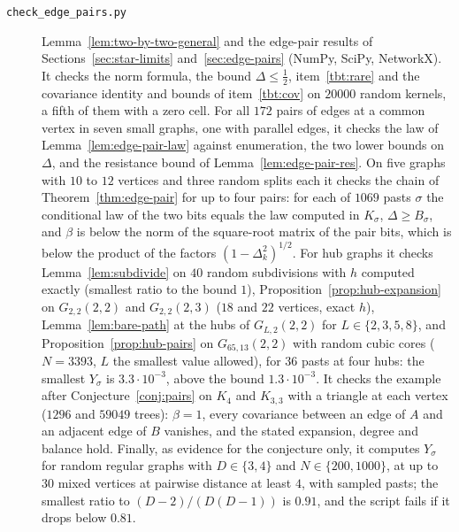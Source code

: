 \begin{description}
\item[\texttt{check\_edge\_pairs.py}] Lemma~\ref{lem:two-by-two-general} and the edge-pair results of Sections~\ref{sec:star-limits} and~\ref{sec:edge-pairs} (NumPy, SciPy, NetworkX). It checks the norm formula, the bound $\Delta\le\frac12$, item~\ref{tbt:rare} and the covariance identity and bounds of item~\ref{tbt:cov} on $20000$ random kernels, a fifth of them with a zero cell. For all $172$ pairs of edges at a common vertex in seven small graphs, one with parallel edges, it checks the law of Lemma~\ref{lem:edge-pair-law} against enumeration, the two lower bounds on $\Delta$, and the resistance bound of Lemma~\ref{lem:edge-pair-res}. On five graphs with $10$ to $12$ vertices and three random splits each it checks the chain of Theorem~\ref{thm:edge-pair} for up to four pairs: for each of $1069$ pasts $\sigma$ the conditional law of the two bits equals the law computed in $K_\sigma$, $\Delta\ge B_\sigma$, and $\beta$ is below the norm of the square-root matrix of the pair bits, which is below the product of the factors $(1-\Delta_k^2)^{1/2}$. For hub graphs it checks Lemma~\ref{lem:subdivide} on $40$ random subdivisions with $h$ computed exactly (smallest ratio to the bound $1$), Proposition~\ref{prop:hub-expansion} on $G_{2,2}(2,2)$ and $G_{2,2}(2,3)$ ($18$ and $22$ vertices, exact $h$), Lemma~\ref{lem:bare-path} at the hubs of $G_{L,2}(2,2)$ for $L\in\{2,3,5,8\}$, and Proposition~\ref{prop:hub-pairs} on $G_{65,13}(2,2)$ with random cubic cores ($N=3393$, $L$ the smallest value allowed), for $36$ pasts at four hubs: the smallest $Y_\sigma$ is $3.3\cdot10^{-3}$, above the bound $1.3\cdot10^{-3}$. It checks the example after Conjecture~\ref{conj:pairs} on $K_4$ and $K_{3,3}$ with a triangle at each vertex ($1296$ and $59049$ trees): $\beta=1$, every covariance between an edge of $A$ and an adjacent edge of $B$ vanishes, and the stated expansion, degree and balance hold. Finally, as evidence for the conjecture only, it computes $Y_\sigma$ for random regular graphs with $D\in\{3,4\}$ and $N\in\{200,1000\}$, at up to $30$ mixed vertices at pairwise distance at least $4$, with sampled pasts; the smallest ratio to $(D-2)/(D(D-1))$ is $0.91$, and the script fails if it drops below $0.81$.


\end{description}
